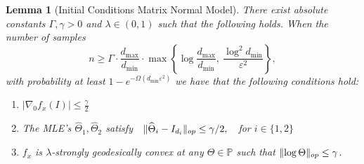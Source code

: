 \documentclass[aos]{imsart}
\newtheorem{lemma}[theorem]{Lemma}
\theoremstyle{definition}
\numberwithin{equation}{section}
\DeclarePairedDelimiter{\norm}{\lVert}{\rVert}
\newcommand{\htheta}{\widehat{\Theta}}
\newcommand{\SPD}{\mathbb{P}}
\def\dmin{d_{\min}}
\def\dmax{d_{\max}}
\begin{document}
\begin{lemma}[Initial Conditions Matrix Normal Model]\label{lem:matrix-normal-initial-conditions}
There exist absolute constants $\Gamma, \gamma > 0$ and $\lambda \in (0,1)$ such that the following holds.
	When the number of samples 
	$$n \geq \Gamma \cdot \dfrac{\dmax}{\dmin} \cdot \max\left\{ \log \dfrac{\dmax}{\dmin}, \ \dfrac{\log^2 \dmin}{\varepsilon^2}  \right\},$$ 
	with probability at least $1 - e^{- \Omega(\dmin \varepsilon^2)}$ we have that the following conditions hold:
	\begin{enumerate}
		\item $|\nabla_0 f_x(I)| \leq \frac{\gamma}{2}$
		\item The MLE's $\htheta_1, \htheta_2$ satisfy $\ \ \norm{\htheta_i - I_{d_i}}_{op} \leq \gamma/2, \ \ $ for $i \in \{1,2\}$
		\item $f_x$ is $\lambda$-strongly geodesically convex at any $\Theta \in \SPD$ such that $\norm{\log \Theta}_{op} \leq \gamma$.
	\end{enumerate}
\end{lemma}
\end{document}
